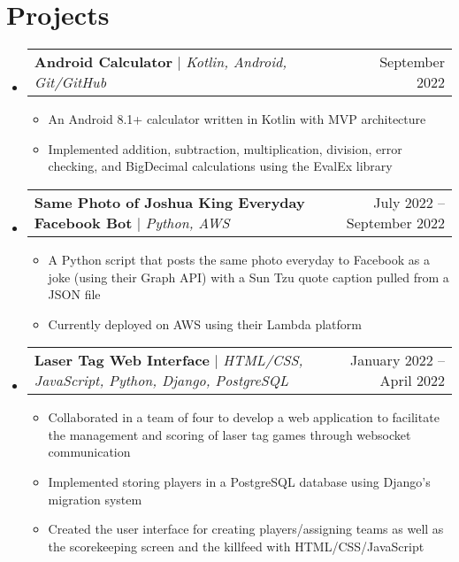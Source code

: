 \documentclass[letterpaper,11pt]{article}
\makeatletter
\newcommand{\resumeItem}[1]{
  \item\small{
    {#1 \vspace{-2pt}}
  }
}
\newcommand{\resumeProjectHeading}[2]{
    \item
    \begin{tabular*}{0.97\textwidth}{l@{\extracolsep{\fill}}r}
      \small#1 & #2 \\
    \end{tabular*}\vspace{-7pt}
}
\newcommand{\resumeSubHeadingListStart}{\begin{itemize}[leftmargin=0.15in, label={}]}
\newcommand{\resumeSubHeadingListEnd}{\end{itemize}}
\newcommand{\resumeItemListStart}{\begin{itemize}}
\newcommand{\resumeItemListEnd}{\end{itemize}\vspace{-5pt}}
\makeatother
\begin{document}
\section{Projects}
    \resumeSubHeadingListStart
      \resumeProjectHeading
          {\textbf{Android Calculator} $|$ \emph{Kotlin, Android, Git/GitHub}}{September 2022}
          \resumeItemListStart
            \resumeItem{An Android 8.1+ calculator written in Kotlin with MVP architecture}
            \resumeItem{Implemented addition, subtraction, multiplication, division, error checking, and BigDecimal calculations using the EvalEx library}
          \resumeItemListEnd
      \resumeProjectHeading
          {\textbf{Same Photo of Joshua King Everyday Facebook Bot} $|$ \emph{Python, AWS}}{July 2022 -- September 2022}
          \resumeItemListStart
            \resumeItem{A Python script that posts the same photo everyday to Facebook as a joke (using their Graph API) with a Sun Tzu quote caption pulled from a JSON file}
            \resumeItem{Currently deployed on AWS using their Lambda platform}
          \resumeItemListEnd
      \resumeProjectHeading
          {\textbf{Laser Tag Web Interface} $|$ \emph{HTML/CSS, JavaScript, Python, Django, PostgreSQL}}{January 2022 -- April 2022}
          \resumeItemListStart
            \resumeItem{Collaborated in a team of four to develop a web application to facilitate the management and scoring of laser tag games through websocket communication}
            \resumeItem{Implemented storing players in a PostgreSQL database using Django's migration system}
            \resumeItem{Created the user interface for creating players/assigning teams as well as the scorekeeping screen and the killfeed with HTML/CSS/JavaScript}
          \resumeItemListEnd
    \resumeSubHeadingListEnd



%



\end{document}
